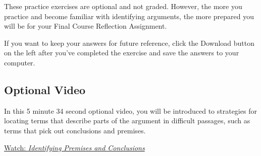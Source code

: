 \documentclass[
]{book}
\begin{document}
\begin{reflect}
These practice exercises are optional and not graded. However, the more you practice and become familiar with identifying arguments, the more prepared you will be for your Final Course Reflection Assignment.

If you want to keep your answers for future reference, click the Download button on the left after you've completed the exercise and save the answers to your computer.
\end{reflect}

\hypertarget{optional-video-11}{%
\subsection*{Optional Video}\label{optional-video-11}}

\begin{reflect}
In this 5 minute 34 second optional video, you will be introduced to strategies for locating terms that describe parts of the argument in difficult passages, such as terms that pick out conclusions and premises.

\href{https://www.youtube.com/watch?v=07mehbgE5jc}{Watch: \emph{Identifying Premises and Conclusions}}
\end{reflect}

  
\end{document}
